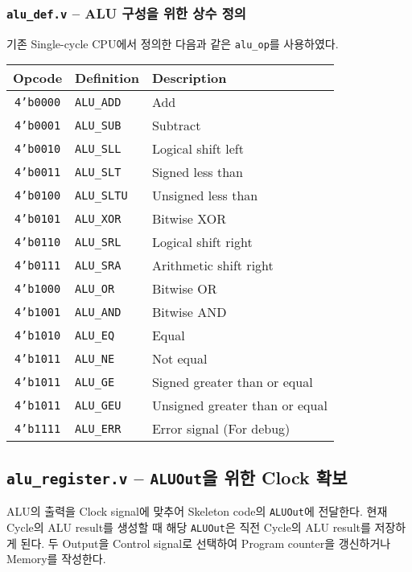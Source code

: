 \documentclass{scrartcl}
\begin{document}
\subsubsection{\texttt{alu\_def.v} -- ALU 구성을 위한 상수 정의}
기존 Single-cycle CPU에서 정의한 다음과 같은 \texttt{alu\_op}를 사용하였다.

\begin{center}
  \begin{tabular}{ | c | l | l | }
    \hline
    Opcode & Definition & Description \\ \hline
    \texttt{4'b0000} & \texttt{ALU\_ADD} & Add \\
    \texttt{4'b0001} & \texttt{ALU\_SUB} & Subtract \\
    \texttt{4'b0010} & \texttt{ALU\_SLL} & Logical shift left \\
    \texttt{4'b0011} & \texttt{ALU\_SLT} & Signed less than \\
    \texttt{4'b0100} & \texttt{ALU\_SLTU} & Unsigned less than \\
    \texttt{4'b0101} & \texttt{ALU\_XOR} & Bitwise XOR \\
    \texttt{4'b0110} & \texttt{ALU\_SRL} & Logical shift right \\
    \texttt{4'b0111} & \texttt{ALU\_SRA} & Arithmetic shift right \\
    \texttt{4'b1000} & \texttt{ALU\_OR} & Bitwise OR \\
    \texttt{4'b1001} & \texttt{ALU\_AND} & Bitwise AND \\
    \texttt{4'b1010} & \texttt{ALU\_EQ} & Equal \\
    \texttt{4'b1011} & \texttt{ALU\_NE} & Not equal \\
    \texttt{4'b1011} & \texttt{ALU\_GE} & Signed greater than or equal \\
    \texttt{4'b1011} & \texttt{ALU\_GEU} & Unsigned greater than or equal \\
    \texttt{4'b1111} & \texttt{ALU\_ERR} & Error signal (For debug) \\
    \hline
  \end{tabular}
\end{center}

\subsection{\texttt{alu\_register.v} -- \texttt{ALUOut}을 위한 Clock 확보}
ALU의 출력을 Clock signal에 맞추어 Skeleton code의 \texttt{ALUOut}에 전달한다. 현재 Cycle의 ALU result를 생성할 때
해당 \texttt{ALUOut}은 직전 Cycle의 ALU result를 저장하게 된다. 두 Output을 Control signal로 선택하여
Program counter을 갱신하거나 Memory를 작성한다.
\end{document}
